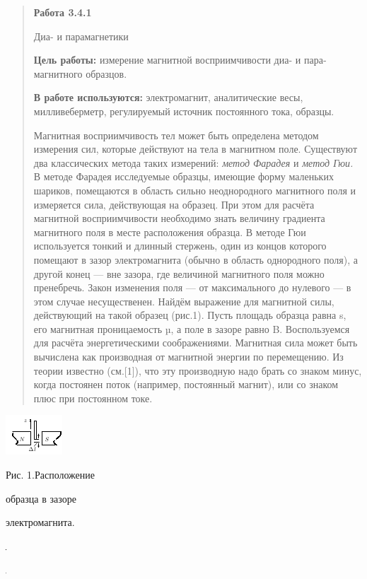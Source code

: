 \documentclass[]{article}
\date{}
\begin{document}
\begin{quote}
\textbf{Работа 3.4.1}

Диа- и парамагнетики

\textbf{Цель работы:} измерение магнитной восприимчивости диа- и
пара­магнитного образцов.

\textbf{В работе используются:} электромагнит, аналитические весы,
милливеберметр, регулируемый источник постоянного тока, образцы.

Магнитная восприимчивость тел может быть определена методом измерения
сил, которые действуют на тела в магнитном поле. Суще­ствуют два
классических метода таких измерений: \emph{метод Фарадея} и \emph{метод
Гюи.} В методе Фарадея исследуемые образцы, имеющие форму маленьких
шариков, помещаются в область сильно неоднородного маг­нитного поля и
измеряется сила, действующая на образец. При этом для расчёта магнитной
восприимчивости необходимо знать величину градиента магнитного поля в
месте расположения образца. В методе Гюи используется тонкий и длинный
стержень, один из концов которо­го помещают в зазор электромагнита
(обычно в область однородного поля), а другой конец --- вне зазора, где
величиной магнитного поля можно пренебречь. Закон изменения поля --- от
максимального до ну­левого --- в этом случае несущественен. Найдём
выражение для магнитной силы, действующий на такой образец (рис.1).
Пусть площадь образца равна s, его магнитная проницаемость µ, а поле в
зазоре равно B. Воспользуемся для расчёта энергетическими соображениями.
Магнитная сила может быть вычислена как производная от магнитной энергии
по перемещению. Из теории известно (см.{[}1{]}), что эту производную
надо брать со знаком минус, когда постоянен поток (например, постоянный
магнит), или со знаком плюс при постоянном токе.
\end{quote}

\includegraphics{./media/image1.png}

Рис. 1.Расположение

образца в зазоре

электромагнита.

\includegraphics{./media/image2.jpeg}

\includegraphics{./media/image3.jpeg}
\end{document}
